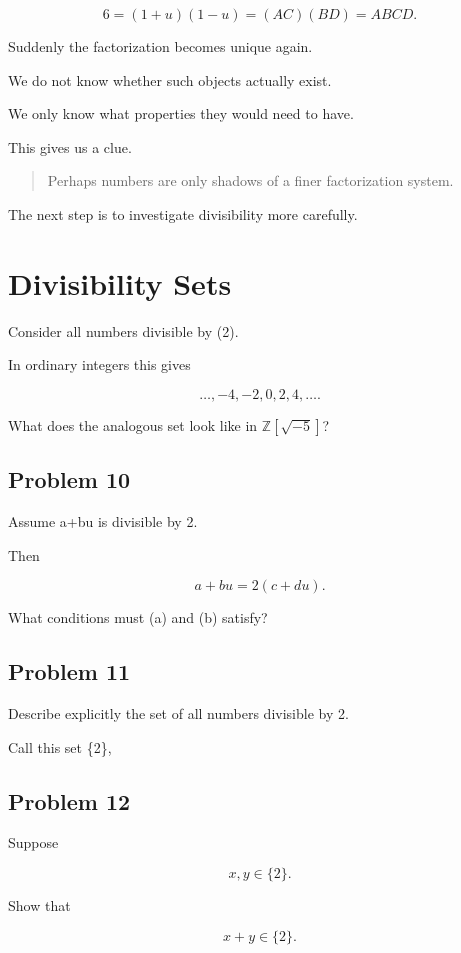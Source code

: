 \[
6 = (1+u)(1-u) = (AC)(BD) = ABCD.
\]

Suddenly the factorization becomes unique again.

We do not know whether such objects actually exist.

We only know what properties they would need to have.

This gives us a clue.

\begin{quote}
Perhaps numbers are only shadows of a finer factorization system.
\end{quote}

The next step is to investigate divisibility more carefully.

\section{Divisibility Sets}

Consider all numbers divisible by (2).

In ordinary integers this gives

\[
{\ldots,-4,-2,0,2,4,\ldots}.
\]

What does the analogous set look like in $\mathbb Z[\sqrt{-5}]$?

\subsection{Problem 10}

Assume a+bu is divisible by 2.

Then

\[
a+bu=2(c+du).
\]

What conditions must (a) and (b) satisfy?

\subsection{Problem 11}

Describe explicitly the set of all numbers divisible by 2.

Call this set \{2\},

\subsection{Problem 12}

Suppose

\[
x,y\in\{2\}.
\]

Show that

\[
x+y\in\{2\}.
\]

